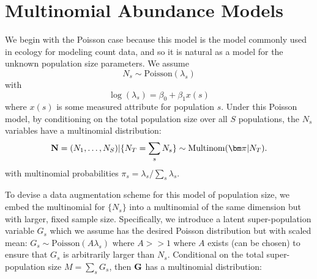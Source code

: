 \section{Multinomial Abundance Models}


We begin with the Poisson case because this model is the 
model commonly used in ecology for modeling count data, and so it
is natural  as a model for the unknown population size parameters.
We assume
\begin{equation}
 N_{s} \sim \mbox{Poisson}(\lambda_{s})
\label{eq.poisson1}
\end{equation}
with
\begin{equation}
\log( \lambda_{s} ) = \beta_{0} + \beta_{1} x(s)
\label{eq.poisson2}
\end{equation}
where $x(s)$ is some measured attribute for population $s$. Under this
Poisson model, by conditioning on the total population size over all
$S$ populations, the $N_{s}$ variables have a multinomial distribution:
\begin{equation}
{\bf N} = (N_{1},\ldots,N_{S}) | \{ N_{T} =
\sum_{s} N_{s} \} \sim \mbox{Multinom}( {\bm \pi} | N_{T}).
\label{eq.mn.N}
\end{equation}
with 
multinomial probabilities $\pi_{s} = \lambda_{s}/\sum_{s} \lambda_{s}$.


To devise a data augmentation scheme for this model of population
size, we  embed the multinomial for $\{ N_{s} \}$ into a
multinomial of the same dimension but with larger, fixed sample size. 
Specifically, we introduce a latent super-population variable $G_{s}$
which we assume has the desired Poisson distribution but with scaled mean:
 $G_{s} \sim \mbox{Poisson}(A \lambda_{s})$ where $A>>1$ where $A$ 
exists (can be chosen) to ensure that $G_{s}$ is arbitrarily larger than $N_{s}$.
Conditional on the total
super-population size $M = \sum_{s} G_{s}$, then  ${\bf G}$ has a
multinomial distribution: 

